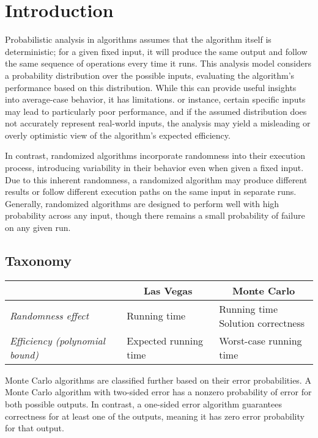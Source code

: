 \section{Introduction}

Probabilistic analysis in algorithms assumes that the algorithm itself is deterministic; for a given fixed input, it will produce the same output and follow the same sequence of operations every time it runs. 
This analysis model considers a probability distribution over the possible inputs, evaluating the algorithm's performance based on this distribution.
While this can provide useful insights into average-case behavior, it has limitations.
or instance, certain specific inputs may lead to particularly poor performance, and if the assumed distribution does not accurately represent real-world inputs, the analysis may yield a misleading or overly optimistic view of the algorithm's expected efficiency.

In contrast, randomized algorithms incorporate randomness into their execution process, introducing variability in their behavior even when given a fixed input.
Due to this inherent randomness, a randomized algorithm may produce different results or follow different execution paths on the same input in separate runs.
Generally, randomized algorithms are designed to perform well with high probability across any input, though there remains a small probability of failure on any given run.

\subsection{Taxonomy}
\renewcommand*{\arraystretch}{2}
\begin{table}[H]
    \centering
    \begin{tabular}{l|l|l|}
    \cline{2-3}
                                              & \multicolumn{1}{c|}{\textbf{Las Vegas}}                        & \multicolumn{1}{c|}{\textbf{Monte Carlo}}                         \\ \hline
    \multicolumn{1}{|l|}{\textit{Randomness effect}} & Running time                                      & \makecell[l]{Running time \\ Solution correctness}               \\ \hline
    \multicolumn{1}{|l|}{\textit{Efficiency (polynomial bound)}} & Expected running time & Worst-case running time  \\ \hline
    \end{tabular}
\end{table}
\renewcommand*{\arraystretch}{1}
Monte Carlo algorithms are classified further based on their error probabilities. 
A Monte Carlo algorithm with two-sided error has a nonzero probability of error for both possible outputs. 
In contrast, a one-sided error algorithm guarantees correctness for at least one of the outputs, meaning it has zero error probability for that output.